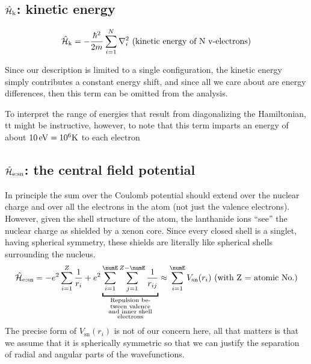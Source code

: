 \documentclass{article}
\begin{document}
\subsection{$\hat{\mathcal{H}}_\text{k}$: kinetic energy}

    \begin{equation}
        \hat{\mathcal{H}}_\text{k} = -\frac{\hbar^2}{2m}\sum_{i=1}^N \nabla_i^2 \text{ (kinetic energy of N v-electrons)}
    \end{equation}

    Since our description is limited to a single configuration, the kinetic energy simply contributes a constant energy shift, and since all we care about are energy differences, then this term can be omitted from the analysis.
    
    To interpret the range of energies that result from diagonalizing the Hamiltonian, tt might be instructive, however, to note that this term imparts an energy of about $10\,\text{eV} = 10^6 \text{K}$ to each electron

\subsection{$\hat{\mathcal{H}}_\text{e:sn}$: the central field potential}

	In principle the sum over the Coulomb potential should extend over the nuclear charge and over all the electrons in the atom (not just the valence electrons). However, given the shell structure of the atom, the lanthanide ions ``see'' the nuclear charge as shielded by a xenon core. Since every closed shell is a singlet, having spherical symmetry, these shields are literally like spherical shells surrounding the nucleus.
    \begin{equation}
    \hamNuclearCoulombSymbol = -e^2 \sum_{i=1}^{Z} \frac{1}{r_{i}} + e^2 \underbracket{\sum_{i=1}^{\numE}\sum_{j=1}^{Z-\numE} \frac{1}{r_{ij}}}_{\substack{
            \text{Repulsion be-} \\
            \text{tween valence} \\
            \text{and inner shell} \\
            \text{electrons} 
            }
          } \approx \sum_{i=1}^\numE V_\text{sn}(r_i) \text{ (with Z = atomic No.)}
    \end{equation}
	The precise form of $V_\text{sn}(r_i)$ is not of our concern here, all that matters is that we assume that it is spherically symmetric so that we can justify the separation of radial and angular parts of the wavefunctions.
\end{document}
